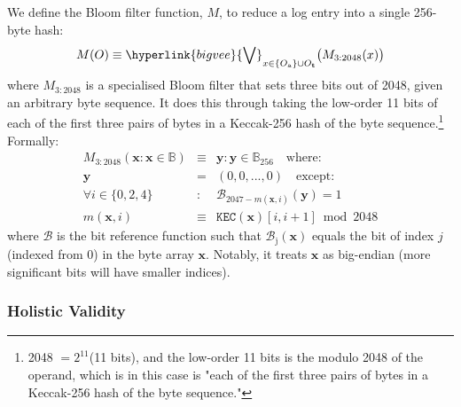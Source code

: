 \documentclass[9pt,oneside]{amsart}
\begin{document}
\begin{multicols}{2}
We define the Bloom filter function, $M$, to reduce a log entry into a single 256-byte hash:
\begin{equation}
M(O) \equiv \hyperlink{bigvee}{\bigvee}_{x \in \{O_{\mathrm{a}}\} \cup O_{\mathbf{t}}} \big( M_{3:2048}(x) \big)
\end{equation}
where $M_{3:2048}$ is a specialised Bloom filter that sets three bits out of 2048, given an arbitrary byte sequence. It does this through taking the low-order 11 bits of each of the first three pairs of bytes in a Keccak-256 hash of the byte sequence.\footnote{2048 $= 2^{11}$(11 bits), and the low-order 11 bits is the modulo 2048 of the operand, which is in this case is "each of the first three pairs of bytes in a Keccak-256 hash of the byte sequence."} Formally:
\begin{eqnarray}
M_{3:2048}(\mathbf{x}: \mathbf{x} \in \mathbb{B}) & \equiv & \mathbf{y}: \mathbf{y} \in \mathbb{B}_{256} \quad \text{where:}\\
\mathbf{y} & = & (0, 0, ..., 0) \quad \text{except:}\\
\forall i \in \{0, 2, 4\}&:&\mathcal{B}_{2047 - m(\mathbf{x}, i)}(\mathbf{y}) = 1\\
m(\mathbf{x}, i) &\equiv& \mathtt{KEC}(\mathbf{x})[i, i + 1] \bmod 2048
\end{eqnarray}
where $\mathcal{B}$ is the bit reference function such that $\mathcal{B}_{\mathrm{j}}(\mathbf{x})$ equals the bit of index $j$ (indexed from 0) in the byte array $\mathbf{x}$.
Notably, it treats $\mathbf{x}$ as big-endian (more significant bits will have smaller indices).

\subsubsection{Holistic Validity}


\end{multicols}
\end{document}
